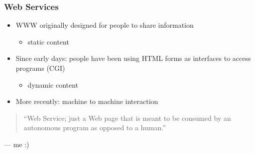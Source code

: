 \documentclass{beamer}
\begin{document}
\begin{frame}\frametitle{Web Services} 
  \begin{itemize}
    \item WWW originally designed for people to share information
    \begin{itemize}
      \item static content
    \end{itemize}    \pause
          
    \item Since early days: people have been using HTML forms as interfaces to access programs (CGI)
    \begin{itemize}
      \item dynamic content
    \end{itemize}    \pause
      
    \item More recently: machine to machine interaction      
    
    \pause
      
  \end{itemize}
  
\begin{quote}
``Web Service; just a Web page that is meant to be consumed by an autonomous program as opposed to a human.''
\end{quote}\par\raggedleft--- \textup{me :)}   
  
\end{frame}
\end{document}
